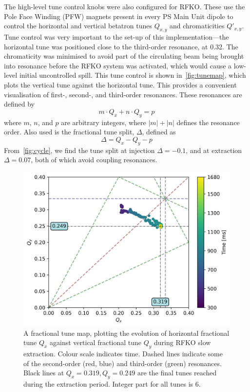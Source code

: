 \documentclass[a4paper,twoside,11pt]{report}
\begin{document}
The high-level tune control knobs were also configured for RFKO. These use the Pole Face Winding (PFW) magnets present in every PS Main Unit dipole to control the horizontal and vertical betatron tunes $Q_{x, y}$ and chromaticities $Q'_{x, y}$. Tune control was very important to the set-up of this implementation---the horizontal tune was positioned close to the third-order resonance, at 0.32. The chromaticity was minimised to avoid part of the circulating beam being brought into resonance before the RFKO system was activated, which would cause a low-level initial uncontrolled spill. This tune control is shown in~\autoref{fig:tunemap}, which plots the vertical tune against the horizontal tune. This provides a convenient visualisation of first-, second-, and third-order resonances. These resonances are defined by
\begin{equation}
  m\cdot Q_x+n\cdot Q_y=p
\end{equation} where $m$, $n$, and $p$ are arbitrary integers, where $|m|+|n|$ defines the resonance order. Also used is the fractional tune split, $\Delta$, defined as
\begin{equation}
  \Delta = Q_x-Q_y-p
\end{equation}
From~\autoref{fig:cycle}, we find the tune split at injection $\Delta=-0.1$, and at extraction $\Delta=0.07$, both of which avoid coupling resonances.

\begin{figure}
  \centering
  \includegraphics[width=0.6\linewidth]{tunemap.png}
  \caption[Fractional tune map during RFKO slow extraction]{A fractional tune map, plotting the evolution of horizontal fractional tune $Q_x$ against vertical fractional tune $Q_y$ during RFKO slow extraction. Colour scale indicates time. Dashed lines indicate some of the second-order (red, blue) and third-order (green) resonances. Black lines at $Q_x=0.319, Q_y=0.249$ are the final tunes reached during the extraction period. Integer part for all tunes is 6.}\label{fig:tunemap}
\end{figure}
\end{document}
